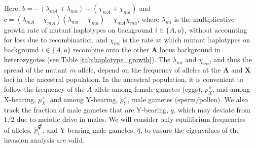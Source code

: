 \documentclass[12pt]{article}
\begin{document}
Here, $b= - (\lambda_{mA} + \lambda_{ma})+(\chi_{mA} + \chi_{ma})$ and $c = (\lambda_{mA}-\chi_{mA}) (\lambda_{ma}-\chi_{ma}) -\chi_{mA} \chi_{ma}$, where $\lambda_{mi}$ is the multiplicative growth rate of mutant haplotypes on background $i\in\{A,a\}$, without accounting for loss due to recombination, and $\chi_{mi}$ is the rate at which mutant haplotypes on background $i\in\{A,a\}$ recombine onto the other \textbf{A} locus background in heterozygotes (see Table \ref{tab:haplotype_growth}).
The $\lambda_{mi}$ and $\chi_{mi}$, and thus the spread of the mutant $m$ allele, depend on the frequency of alleles at the \textbf{A} and \textbf{X} loci in the ancestral population. 
In the ancestral population, it is convenient to follow the frequency of the $A$ allele among female gametes (eggs), $p^\female_X$, and among X-bearing, $p^\male_X$, and among Y-bearing, $p^\male_Y$, male gametes (sperm/pollen). 
We also track the fraction of male gametes that are Y-bearing, $q$, which may deviate from $1/2$ due to meiotic drive in males. 
We will consider only equilibrium frequencies of alleles, $\hat{p}^\Hermaphrodite_i$, and Y-bearing male gametes, $\hat{q}$, to ensure the eigenvalues of the invasion analysis are valid.  

%

\end{document}
